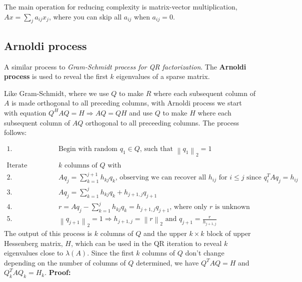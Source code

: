 \documentclass{article}
\newcommand{\norm}[2]{\left\lVert#1\right\rVert_#2}
\begin{document}
The main operation for reducing complexity is matrix-vector multiplication, $Ax = \sum_j a_{ij}x_j$, where you can skip all $a_{ij}$ when $a_{ij} = 0$. 

\subsection{Arnoldi process}
A similar process to \textit{Gram-Schmidt process for QR factorization}. The \textbf{Arnoldi process} is used to reveal the first $k$ eigenvalues of a sparse matrix. 

Like Gram-Schmidt, where we use $Q$ to make $R$ where each subsequent column of $A$ is made orthogonal to all preceding columns, with Arnoldi process we start with equation $Q^HAQ = H \Longrightarrow AQ = QH$ and use $Q$ to make $H$ where each subsequent column of $AQ$ orthogonal to all preceeding columns. The process follows:

\begin{align*}
    1. \; & \textrm{Begin with random } q_1 \in Q \textrm{, such that } \norm{q_1}{2} = 1\\ \\
    \textrm{Iterate through each of the first } & k \textrm{ columns of $Q$ with }\\
    2. \; & Aq_j = \sum_{k = 1}^{j+1} h_{kj}q_k \textrm{, observing we can recover all $h_{ij}$ for $i \leq j$ since } q_i^TAq_j = h_{ij}\\
    3. \; & Aq_j = \sum_{k = 1}^{j} h_{kj}q_k + h_{j+1, j}q_{j+1}\\
    4. \; & r = Aq_j - \sum_{k = 1}^{j} h_{kj}q_k = h_{j+1, j}q_{j+1} \textrm{, where only $r$ is unknown}\\
    5. \;& \norm{q_{j+1}}{2} = 1 \Longrightarrow h_{j+1, j} = \norm{r}{2} \textrm{ and } q_{j+1} = \frac{r}{h_{j+1, j}}
\end{align*}
The output of this process is $k$ columns of $Q$ and the upper $k \times k$ block of upper Hessenberg matrix, $H$, which can be used in the QR iteration to reveal $k$ eigenvalues close to $\lambda(A)$. Since the first $k$ columns of $Q$ don't change depending on the number of columns of $Q$ determined, we have $Q^TAQ = H$ and $Q_k^TAQ_k = H_k$. \textbf{Proof:}
\end{document}
